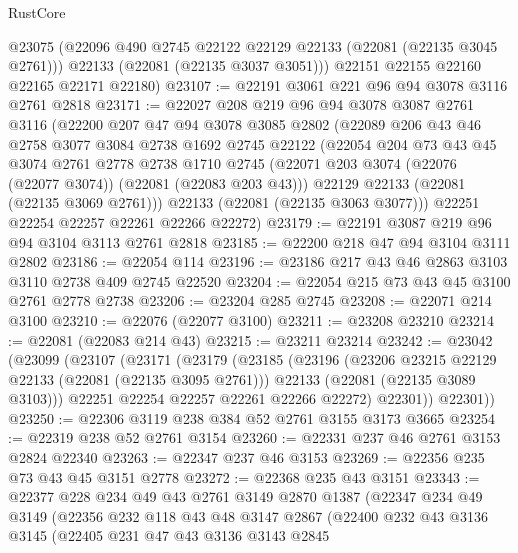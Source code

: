 \begin{lexlean}{RustCore}
\begin{coremodule}
        @23075
        (@22096 @490 @2745 @22122 @22129 @22133 (@22081 (@22135 @3045 @2761)))
        @22133
        (@22081 (@22135 @3037 @3051)))
      @22151
      @22155
      @22160
      @22165
      @22171
      @22180)
@23107 := @22191 @3061 @221 @96 @94 @3078 @3116 @2761 @2818
@23171 := @22027
    @208
    @219
    @96
    @94
    @3078
    @3087
    @2761
    @3116
    (@22200
      @207
      @47
      @94
      @3078
      @3085
      @2802
      (@22089
        @206
        @43
        @46
        @2758
        @3077
        @3084
        @2738
        @1692
        @2745
        @22122
        (@22054
          @204
          @73
          @43
          @45
          @3074
          @2761
          @2778
          @2738
          @1710
          @2745
          (@22071 @203 @3074 (@22076 (@22077 @3074)) (@22081 (@22083 @203 @43)))
          @22129
          @22133
          (@22081 (@22135 @3069 @2761)))
        @22133
        (@22081 (@22135 @3063 @3077)))
      @22251
      @22254
      @22257
      @22261
      @22266
      @22272)
@23179 := @22191 @3087 @219 @96 @94 @3104 @3113 @2761 @2818
@23185 := @22200 @218 @47 @94 @3104 @3111 @2802
@23186 := @22054 @114
@23196 := @23186 @217 @43 @46 @2863 @3103 @3110 @2738 @409 @2745 @22520
@23204 := @22054 @215 @73 @43 @45 @3100 @2761 @2778 @2738
@23206 := @23204 @285 @2745
@23208 := @22071 @214 @3100
@23210 := @22076 (@22077 @3100)
@23211 := @23208 @23210
@23214 := @22081 (@22083 @214 @43)
@23215 := @23211 @23214
@23242 := @23042
    (@23099
      (@23107
        (@23171
          (@23179
            (@23185
              (@23196
                (@23206 @23215 @22129 @22133 (@22081 (@22135 @3095 @2761)))
                @22133
                (@22081 (@22135 @3089 @3103)))
              @22251
              @22254
              @22257
              @22261
              @22266
              @22272)
            @22301))
        @22301))
@23250 := @22306 @3119 @238 @384 @52 @2761 @3155 @3173 @3665
@23254 := @22319 @238 @52 @2761 @3154
@23260 := @22331 @237 @46 @2761 @3153 @2824 @22340
@23263 := @22347 @237 @46 @3153
@23269 := @22356 @235 @73 @43 @45 @3151 @2778
@23272 := @22368 @235 @43 @3151
@23343 := @22377
    @228
    @234
    @49
    @43
    @2761
    @3149
    @2870
    @1387
    (@22347
      @234
      @49
      @3149
      (@22356
        @232
        @118
        @43
        @48
        @3147
        @2867
        (@22400
          @232
          @43
          @3136
          @3145
          (@22405
            @231
            @47
            @43
            @3136
            @3143
            @2845

\end{coremodule}
\end{lexlean}
